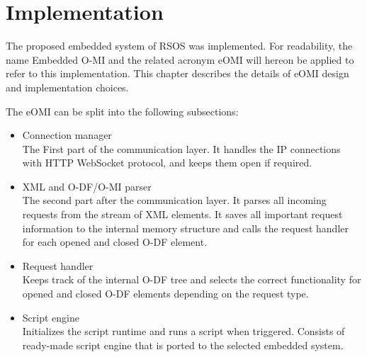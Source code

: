 \chapter{Implementation}
\label{chapter:implementation}

%

The proposed embedded system of RSOS was implemented. For readability, the name Embedded O-MI and the related acronym eOMI will hereon be applied to refer to this implementation.
This chapter describes the details of eOMI design and implementation choices.


The eOMI can be split into the following subsections: %

\begin{itemize}
  \item Connection manager\\
    The First part of the communication layer. It handles the IP connections with HTTP WebSocket protocol, and keeps them open if required.
  \item XML and O-DF/O-MI parser\\
    The second part after the communication layer. It parses all incoming requests from the stream of XML elements. It saves all important request information to the internal memory structure and calls the request handler for each opened and closed O-DF element.
  \item Request handler\\
    Keeps track of the internal O-DF tree and selects the correct functionality for opened and closed O-DF elements depending on the request type.
  \item Script engine\\
    Initializes the script runtime and runs a script when triggered. Consists of ready-made script engine that is ported to the selected embedded system.

\end{itemize}

